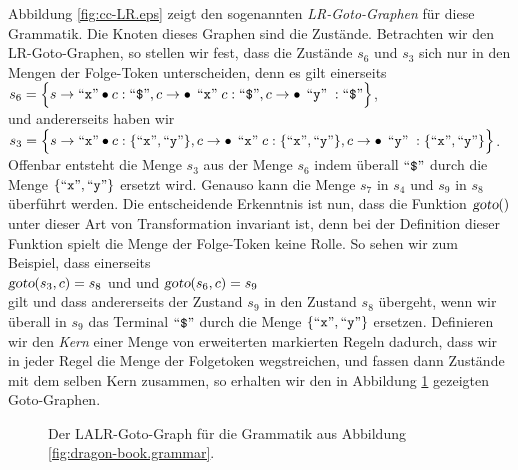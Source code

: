Abbildung \ref{fig:cc-LR.eps} zeigt den sogenannten \emph{LR-Goto-Graphen} f\"ur diese Grammatik.
Die Knoten dieses Graphen sind die Zust\"ande.  
Betrachten wir den LR-Goto-Graphen, so stellen wir fest, dass die Zust\"ande $s_6$ und
$s_3$ sich nur in den Mengen der Folge-Token unterscheiden, denn es gilt einerseits
\\[0.2cm]
\hspace*{1.3cm}
$s_6 = \Bigl\{ s \rightarrow \squoted{x} \bullet c: \squoted{\symbol{36}}, 
                 c \rightarrow \bullet\, \quoted{x} c:  \squoted{\symbol{36}},
                 c \rightarrow \bullet\, \quoted{y}:    \squoted{\symbol{36}}
       \Bigr\}$, 
\\[0.2cm]
und andererseits haben wir
\\[0.2cm]
\hspace*{1.3cm}
$s_3 = \Bigl\{ s \rightarrow \mbox{``\texttt{x}''} \bullet c: \{ \mbox{``\texttt{x}''}, \mbox{``\texttt{y}''} \}, 
                 c \rightarrow \bullet\, \;\mbox{``\texttt{x}''}\; c:  \{ \mbox{``\texttt{x}''}, \mbox{``\texttt{y}''} \},
                 c \rightarrow \bullet\, \;\mbox{``\texttt{y}''}\;:    \{ \mbox{``\texttt{x}''}, \mbox{``\texttt{y}''} \}  
       \Bigr\}$.
\\[0.2cm]
Offenbar entsteht die Menge $s_3$ aus der Menge $s_6$ indem \"uberall $\squoted{\symbol{36}}$
durch die Menge $\{ \mbox{``\texttt{x}''}, \mbox{``\texttt{y}''}\}$ ersetzt wird.  Genauso kann die Menge $s_7$ in $s_4$
und $s_9$ in $s_8$ \"uberf\"uhrt werden.  Die entscheidende Erkenntnis ist nun, dass die
Funktion $\textsl{goto}()$ unter dieser Art von Transformation invariant ist, denn bei der
Definition dieser Funktion spielt die Menge der Folge-Token keine Rolle.  So sehen wir zum
Beispiel, dass einerseits
\\[0.2cm]
\hspace*{1.3cm}
$\textsl{goto}(s_3, c) = s_8$ \quad und \quad und 
$\textsl{goto}(s_6, c) = s_9$ 
\\[0.2cm]
gilt und dass andererseits der Zustand $s_9$ in den Zustand $s_8$ \"ubergeht, wenn wir
\"uberall in $s_9$ das Terminal $\squoted{\symbol{36}}$ durch die Menge 
 $\{ \mbox{``\texttt{x}''}, \mbox{``\texttt{y}''}\}$ ersetzen.  Definieren wir den \emph{Kern}
einer Menge von erweiterten markierten Regeln dadurch, dass wir in jeder Regel die Menge
der Folgetoken wegstreichen, und fassen dann Zust\"ande mit dem selben Kern zusammen, so
erhalten wir den in 
Abbildung \ref{fig:cc-LALR.eps} gezeigten Goto-Graphen.

\begin{figure}[!ht]
\centering
  \hspace*{-0.6cm} 
  \caption{Der LALR-Goto-Graph f\"ur die Grammatik aus Abbildung \ref{fig:dragon-book.grammar}.}
  \label{fig:cc-LALR.eps}
\end{figure}

